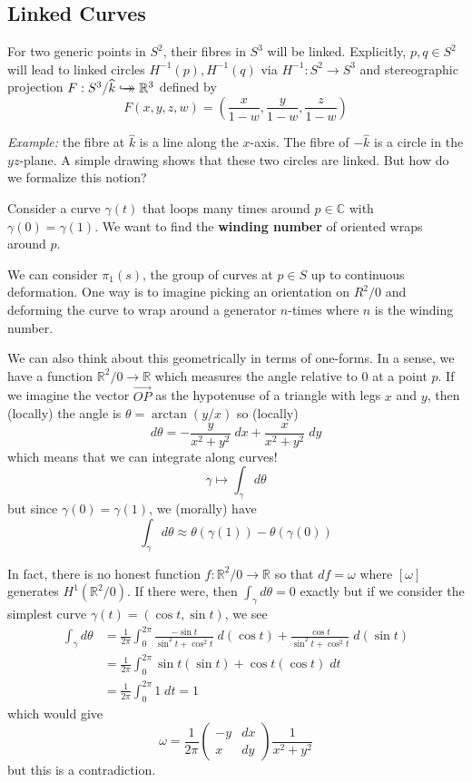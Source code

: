 \documentclass[12pt]{article}
\renewcommand{\hat}[1]{\widehat{#1}}
\newcommand{\R}{\mathbb{R}}
\newcommand{\C}{\mathbb{C}}
\newcommand{\biject}{\hookrightarrow \hspace{-8pt} \rightarrow}
\newcommand{\khat}{\hat{k}}
\begin{document}
\subsection*{Linked Curves}
For two generic points in $S^2$, their fibres in $S^3$ will be linked. Explicitly, $p, q \in S^2$ will lead to linked circles $H^{-1}(p), H^{-1}(q)$ via $H^{-1}:S^2 \to S^3$ and stereographic projection $F: S^3/\khat \biject \R^3$ defined by 
\[F(x, y, z, w) = \left(\frac{x}{1- w}, \frac{y}{1- w}, \frac{z}{1 - w}\right)\] 

\emph{Example:} the fibre at $\khat$ is a line along the $x$-axis. The fibre of $-\khat$ is a circle in the $yz$-plane. A simple drawing shows that these two circles are linked. But how do we formalize this notion? 

Consider a curve $\gamma(t)$ that loops many times around $p \in \C$ with $\gamma(0) = \gamma(1)$. We want to find the \textbf{winding number} of oriented wraps around $p$. 

We can consider $\pi_1(s)$, the group of curves at $p \in S$ up to continuous deformation. One way is to imagine picking an orientation on $R^2/0$ and deforming the curve to wrap around a generator $n$-times where $n$ is the winding number. 

We can also think about this geometrically in terms of one-forms. In a sense, we have a function $\R^2/0 \to \R$ which measures the angle relative to $0$ at a point $p$. If we imagine the vector $\vec{OP}$ as the hypotenuse of a triangle with legs $x$ and $y$, then (locally) the angle is $\theta = \arctan(y/x)$ so (locally)
\[d\theta = -\frac{y}{x^2 + y^2}\; dx + \frac{x}{x^2 + y^2}\; dy\]
which means that we can integrate along curves! 
\[\gamma \mapsto \int_{\gamma}d\theta\]
but since $\gamma(0) = \gamma(1)$, we (morally) have 
\[\int_{\gamma} d\theta \approx \theta(\gamma(1)) - \theta(\gamma(0))\]

In fact, there is no honest function $f: \R^2/0 \to \R$ so that $df = \omega$ where $[\omega]$ generates $H^1(\R^2/0)$. If there were, then $\int_{\gamma} d\theta = 0$ exactly but if we consider the simplest curve $\gamma(t) = (\cos t, \sin t)$, we see 
\begin{align*}
    \int_{\gamma} d\theta &= \frac{1}{2\pi} \int_0^{2\pi} \frac{-\sin t}{\sin^2 t+ \cos^2 t}\; d(\cos t) + \frac{\cos t}{\sin^2 t + \cos^2 t} \; d(\sin t)\\ 
    &= \frac{1}{2\pi} \int_0^{2\pi} \sin t (\sin t) + \cos t (\cos t)\; dt\\ 
    &= \frac{1}{2\pi} \int_0^{2\pi} 1\; dt = 1
\end{align*}
which would give
\[\omega = \frac{1}{2\pi}\begin{pmatrix}
    -y & dx\\ 
    x & dy
\end{pmatrix} \frac{1}{x^2 + y^2}\]
but this is a contradiction. 
\end{document}
